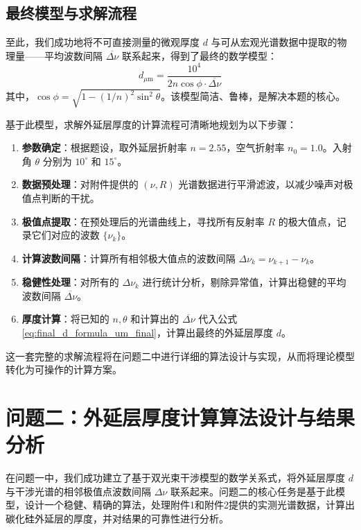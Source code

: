 \documentclass[withoutpreface,bwprint]{cumcmthesis} %
\begin{document}
\subsection{最终模型与求解流程}

至此，我们成功地将不可直接测量的微观厚度 $d$ 与可从宏观光谱数据中提取的物理量——平均波数间隔 $\overline{\Delta\nu}$ 联系起来，得到了最终的数学模型：
\begin{equation}
    \boxed{d_{\mu\text{m}} = \frac{10^4}{2n\cos\phi \cdot \overline{\Delta\nu}}}
    \label{eq:final_d_formula_um_final} %
\end{equation}
其中，$\cos\phi = \sqrt{1 - (1/n)^2 \sin^2\theta}$。该模型简洁、鲁棒，是解决本题的核心。

基于此模型，求解外延层厚度的计算流程可清晰地规划为以下步骤：
\begin{enumerate}
    \item \textbf{参数确定}：根据题设，取外延层折射率 $n=2.55$，空气折射率 $n_0=1.0$。入射角 $\theta$ 分别为 $10^\circ$ 和 $15^\circ$。
    \item \textbf{数据预处理}：对附件提供的 $(\nu, R)$ 光谱数据进行平滑滤波，以减少噪声对极值点判断的干扰。
    \item \textbf{极值点提取}：在预处理后的光谱曲线上，寻找所有反射率 $R$ 的极大值点，记录它们对应的波数 $\{\nu_k\}$。
    \item \textbf{计算波数间隔}：计算所有相邻极大值点的波数间隔 $\Delta\nu_k = \nu_{k+1} - \nu_k$。
    \item \textbf{稳健性处理}：对所有的 $\Delta\nu_k$ 进行统计分析，剔除异常值，计算出稳健的平均波数间隔 $\overline{\Delta\nu}$。
    \item \textbf{厚度计算}：将已知的 $n, \theta$ 和计算出的 $\overline{\Delta\nu}$ 代入公式 \eqref{eq:final_d_formula_um_final}，计算出最终的外延层厚度 $d$。
\end{enumerate}
这一套完整的求解流程将在问题二中进行详细的算法设计与实现，从而将理论模型转化为可操作的计算方案。

\section{问题二：外延层厚度计算算法设计与结果分析}

在问题一中，我们成功建立了基于双光束干涉模型的数学关系式，将外延层厚度 $d$ 与干涉光谱的相邻极值点波数间隔 $\Delta\nu$ 联系起来。问题二的核心任务是基于此模型，设计一个稳健、精确的算法，处理附件1和附件2提供的实测光谱数据，计算出碳化硅外延层的厚度，并对结果的可靠性进行分析。
\end{document}
